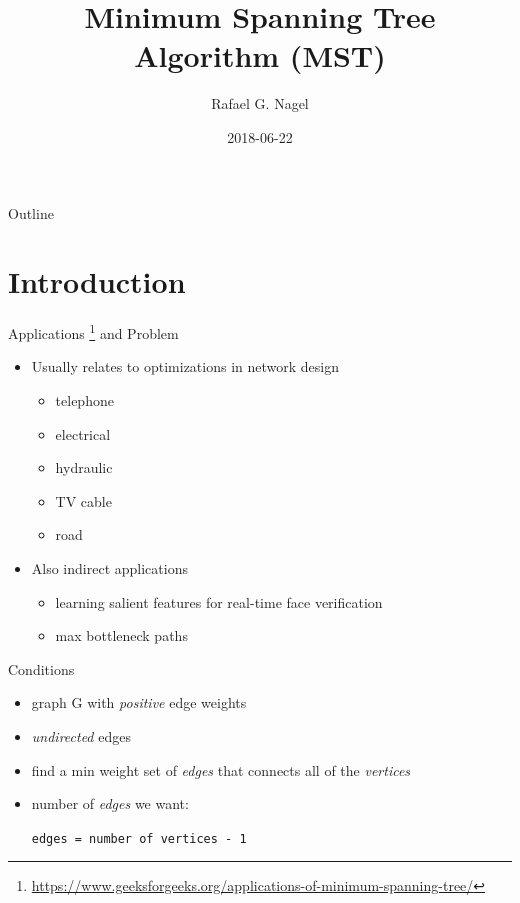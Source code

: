 \documentclass[presentation]{beamer}
\author{Rafael G. Nagel}
\date{2018-06-22}
\title{Minimum Spanning Tree Algorithm (MST)}
\begin{document}
\maketitle
\begin{frame}{Outline}
\setcounter{tocdepth}{2}
\tableofcontents
\end{frame}



\section{Introduction}
\label{sec:orgheadline4}
\begin{frame}[label={sec:orgheadline1}]{Applications \footnote{\url{https://www.geeksforgeeks.org/applications-of-minimum-spanning-tree/}} and Problem}
\begin{itemize}
\item Usually relates to optimizations in \alert{network design}
\begin{itemize}
\item telephone
\item electrical
\item hydraulic
\item TV cable
\item road
\end{itemize}
\item Also indirect applications
\begin{itemize}
\item learning salient features for real-time face verification
\item max bottleneck paths
\end{itemize}
\end{itemize}
\end{frame}
\begin{frame}[fragile,label={sec:orgheadline2}]{Conditions}
 \begin{itemize}
\item graph G with \emph{positive} edge weights
\item \emph{undirected} edges
\item find a \alert{min weight} set of \emph{edges} that connects \alert{all} of the \emph{vertices}
\item number of \emph{edges} we want:
\begin{center}
\texttt{edges = number of vertices - 1}
\end{center}
\end{itemize}
\end{frame}
\end{document}
